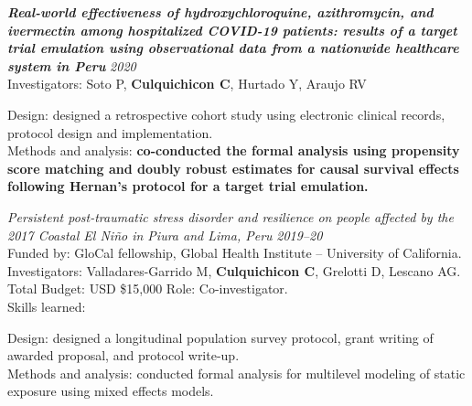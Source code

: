 \documentclass[10pt]{article}
\newenvironment{outerlist}[1][\enskip\textbullet]%
{\begin{itemize}[#1]}{\end{itemize}%
	\vspace{-0.6\baselineskip}}
\newenvironment{innerlist}[1][\enskip$\circ$]%
{\begin{compactitem}[#1]}{\end{compactitem}}
\begin{document}
\vspace{-0.10in}
\begin{outerlist}
	\item[] \textbf{\emph{Real-world effectiveness of hydroxychloroquine, azithromycin, and ivermectin among hospitalized COVID-19 patients: results of a target trial emulation using observational data from a nationwide healthcare system in Peru}}  \hfill {\it 2020}\\
	Investigators: Soto P, {\bf Culquichicon C}, Hurtado Y, Araujo RV \\ 
	\vspace{-0.20in}
	
	\begin{innerlist}
		\item[] 	Design: designed a retrospective cohort study using electronic clinical records, protocol design and implementation. \\
					Methods and analysis: {\bf co-conducted the formal analysis using propensity score matching and doubly robust estimates for causal survival effects following Hernan's protocol for a target trial emulation.}\\
	\end{innerlist}
	
\end{outerlist}


\vspace{-0.25in}
\begin{outerlist}
	\item[] {\it Persistent post-traumatic stress disorder and resilience on people affected by the 2017 Coastal El Niño in Piura and Lima, Peru} \hfill {\it 2019--20}\\
	Funded by: GloCal fellowship, Global Health Institute -- University of California.\\
	Investigators: Valladares-Garrido M, {\bf Culquichicon C}, Grelotti D, Lescano AG. \\
	Total Budget: USD \$15,000 \hfill Role: Co-investigator.\\
	Skills learned:
	\begin{innerlist}
		\item[] 	Design: designed a longitudinal population survey protocol, grant writing of awarded proposal, and protocol write-up. \\
					Methods and analysis: conducted formal analysis for multilevel modeling of static exposure using mixed effects models. \\
	\end{innerlist}
	
	
\end{outerlist}
\end{document}
